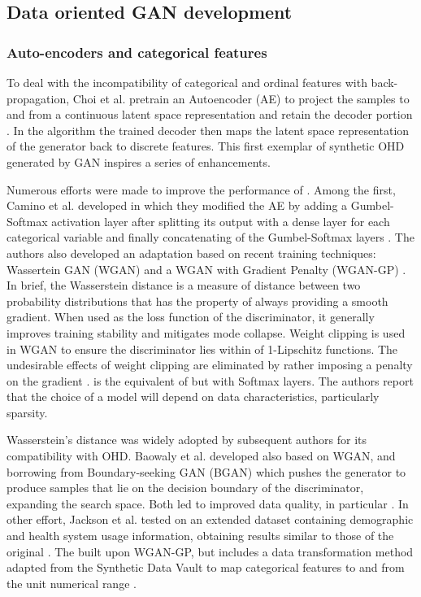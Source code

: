 \subsection{Data oriented GAN development}
\subsubsection{Auto-encoders and categorical features}
To deal with the incompatibility of categorical and ordinal features with back-propagation, Choi et al. pretrain an Autoencoder (AE) to project the samples to and from a continuous latent space representation and retain the decoder portion \cite{choi2017generating}. In the algorithm  the trained decoder then maps the latent space representation of the generator back to discrete features. This first exemplar of synthetic OHD generated by GAN inspires a series of enhancements.\par

Numerous efforts were made to improve the performance of . Among the first, Camino et al. developed  in which they modified the AE by adding a Gumbel-Softmax \cite{jang2016categorical} activation layer after splitting its output with a dense layer for each categorical variable and finally concatenating of the Gumbel-Softmax \todo layers \cite{Camino2018-re}. The authors also developed an adaptation based on recent training techniques: Wassertein GAN (WGAN) \cite{arjovsky2017wasserstein} and a WGAN with Gradient Penalty (WGAN-GP) \cite{gulrajani2017improved}. In brief, the Wasserstein distance is a measure of distance between two probability distributions that has the property of always providing a smooth gradient. When used as the loss function of the discriminator, it generally improves training stability and mitigates mode collapse. Weight clipping is used in WGAN to ensure the discriminator lies within of 1-Lipschitz functions. The undesirable effects of weight clipping are eliminated by rather imposing a penalty on the gradient .  is the equivalent of  but with Softmax layers. The authors report that the choice of a model will depend on data characteristics, particularly sparsity.\par 
Wasserstein's distance was widely adopted by subsequent authors for its compatibility with OHD. Baowaly et al. developed  also based on WGAN, and  borrowing from Boundary-seeking GAN (BGAN) \cite{hjelm2017boundaryseeking} which pushes the generator to produce samples that lie on the decision boundary of the discriminator, expanding the search space. Both led to improved data quality, in particular  \cite{baowaly_2019_IEEE,baowaly_2019_jamia}. In other effort, Jackson et al. tested  on an extended dataset containing demographic and health system usage information, obtaining results similar to those of the original \cite{Jackson_2019}. The  built upon WGAN-GP, but includes a data transformation method adapted from the Synthetic Data Vault \cite{Patki_2016} to map categorical features to and from the unit numerical range \cite{Yale_2020}. 